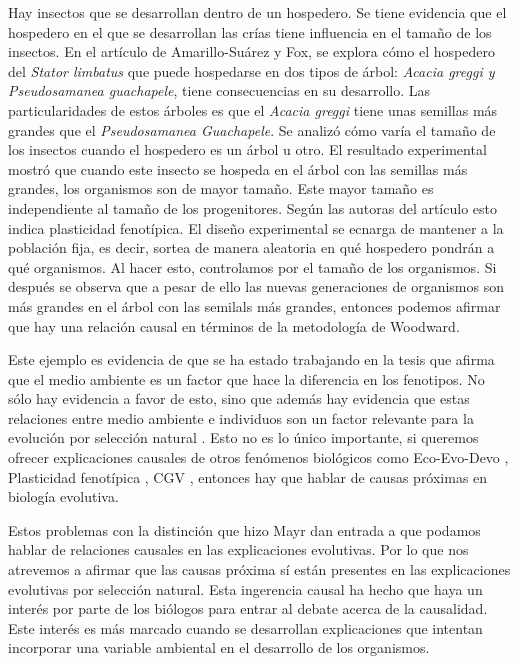 Hay insectos que se desarrollan dentro de un hospedero. Se tiene evidencia que el hospedero en el que se desarrollan las crías tiene influencia en el tamaño de los insectos. En el artículo de Amarillo-Suárez y Fox, se explora cómo el hospedero del \emph{Stator limbatus} que puede hospedarse en dos tipos de árbol: \emph{Acacia greggi y Pseudosamanea guachapele}, tiene consecuencias en su desarrollo. Las particularidades de estos árboles es que el \emph{Acacia greggi} tiene unas semillas más grandes que el \emph{Pseudosamanea Guachapele}. Se analizó cómo varía el tamaño de los insectos cuando el hospedero es un árbol u otro. El resultado experimental mostró que cuando este insecto se hospeda en el árbol con las semillas más grandes, los organismos son de mayor tamaño. Este mayor tamaño es independiente al tamaño de los progenitores. Según las autoras del artículo esto indica plasticidad fenotípica. El diseño experimental se ecnarga de mantener a la población fija, es decir, sortea de manera aleatoria en qué hospedero pondrán a qué organismos. Al hacer esto, controlamos por el tamaño de los organismos. Si después se observa que a pesar de ello las nuevas generaciones de organismos son más grandes en el árbol con las semilals más grandes, entonces podemos afirmar que hay una relación causal en términos de la metodología de Woodward.

Este ejemplo es evidencia de que se ha estado trabajando en la tesis que afirma que el medio ambiente es un factor que hace la diferencia en los fenotipos. No sólo hay evidencia a favor de esto, sino que además hay evidencia que estas relaciones entre medio ambiente e individuos son un factor relevante para la evolución por selección natural \cite{Jablonka2020, Dayan2020, MacColl2011}. Esto no es lo único importante, si queremos ofrecer explicaciones causales de otros fenómenos biológicos como Eco-Evo-Devo \cite{PfenningEco-Evo-Devo}, Plasticidad fenotípica \cite{WESTEBERHARD20082701}, CGV \cite{CVG}, entonces hay que hablar de causas próximas en biología evolutiva.

Estos problemas con la distinción que hizo Mayr dan entrada a que podamos hablar de relaciones causales en las explicaciones evolutivas. Por lo que nos atrevemos a afirmar que las causas próxima sí están presentes en las explicaciones evolutivas por selección natural. Esta ingerencia causal ha hecho que haya un interés por parte de los biólogos para entrar al debate acerca de la causalidad. Este interés es más marcado cuando se desarrollan explicaciones que intentan incorporar una variable ambiental en el desarrollo de los organismos.

